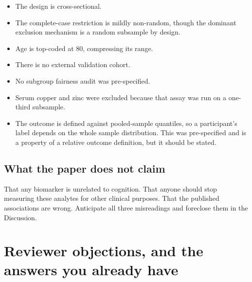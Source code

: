 \documentclass[11pt]{article}
\begin{document}
\begin{itemize}[leftmargin=1.2em,itemsep=3pt,topsep=4pt]
\item The design is cross-sectional.
\item The complete-case restriction is mildly non-random, though the dominant exclusion mechanism is a random subsample by design.
\item Age is top-coded at 80, compressing its range.
\item There is no external validation cohort.
\item No subgroup fairness audit was pre-specified.
\item Serum copper and zinc were excluded because that assay was run on a one-third subsample.
\item The outcome is defined against pooled-sample quantiles, so a participant's label depends on the whole sample distribution. This was pre-specified and is a property of a relative outcome definition, but it should be stated.
\end{itemize}

\subsection*{What the paper does not claim}

That any biomarker is unrelated to cognition. That anyone should stop measuring these analytes for other clinical purposes. That the published associations are wrong. Anticipate all three misreadings and foreclose them in the Discussion.

\section{Reviewer objections, and the answers you already have}
\end{document}
